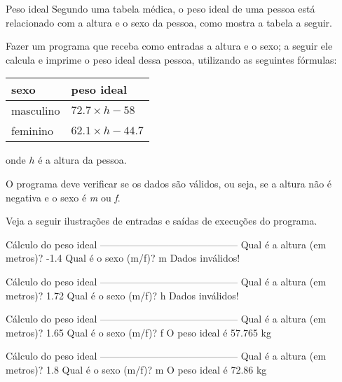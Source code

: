 \documentclass[11pt,fleqn]{practice}
\begin{document}
\begin{task}[breakable]{Peso ideal}{}
  Segundo uma tabela médica, o peso ideal de uma pessoa está relacionado
  com a altura e o sexo da pessoa, como mostra a tabela a seguir.

  Fazer um programa que receba como entradas a altura e o sexo; a seguir
  ele calcula e imprime o peso ideal dessa pessoa, utilizando as
  seguintes fórmulas:
  \begin{center}
    \begin{tabular}{ll} \hline
      \textbf{sexo} & \textbf{peso ideal}    \\\hline
      masculino     & $72.7 \times h - 58$   \\
      feminino      & $62.1 \times h - 44.7$ \\ \hline
    \end{tabular}
  \end{center}
  onde $h$ é a altura da pessoa.

  O programa deve verificar se os dados são válidos, ou seja, se a
  altura não é negativa e o sexo é \emph{m} ou \emph{f}.

  Veja a seguir ilustrações de entradas e saídas de execuções do
  programa.

  \begin{runexample}
Cálculo do peso ideal
------------------------------------------
Qual é a altura (em metros)? -1.4
Qual é o sexo (m/f)? m
Dados inválidos!
  \end{runexample}

  \begin{runexample}
Cálculo do peso ideal
------------------------------------------
Qual é a altura (em metros)? 1.72
Qual é o sexo (m/f)? h
Dados inválidos!    
  \end{runexample}

  \begin{runexample}
Cálculo do peso ideal
------------------------------------------
Qual é a altura (em metros)? 1.65
Qual é o sexo (m/f)? f
O peso ideal é 57.765 kg
  \end{runexample}

  \begin{runexample}
Cálculo do peso ideal
------------------------------------------
Qual é a altura (em metros)? 1.8
Qual é o sexo (m/f)? m
O peso ideal é 72.86 kg
  \end{runexample}

  \tcblower
  \solution
\end{task}
\end{document}
